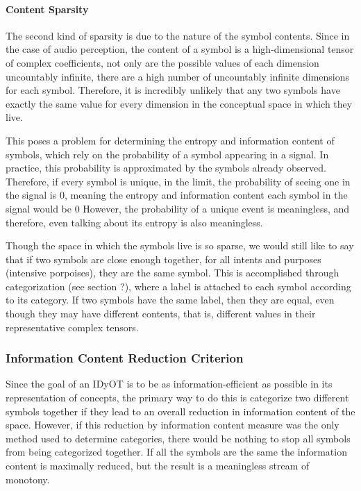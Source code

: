 \paragraph{Content Sparsity}
The second kind of sparsity is due to the nature of the symbol contents.  Since in the case of audio perception, the content of a symbol is a high-dimensional tensor of complex coefficients, not only are the possible values of each dimension uncountably infinite, there are a high number of uncountably infinite dimensions for each symbol.  Therefore, it is incredibly unlikely that any two symbols have exactly the same value for every dimension in the conceptual space in which they live.  

This poses a problem for determining the entropy and information content of symbols, which rely on the probability of a symbol appearing in a signal.  In practice, this probability is approximated by the symbols already observed.  Therefore, if every symbol is unique, in the limit, the probability of seeing one in the signal is 0, meaning the entropy and information content each symbol in the signal would be 0 However, the probability of a unique event is meaningless, and therefore, even talking about its entropy is also meaningless.  

Though the space in which the symbols live is so sparse, we would still like to say that if two symbols are close enough together, for all intents and purposes (intensive porpoises), they are the same symbol.  This is accomplished through categorization (see section ?), where a label is attached to each symbol according to its category.  If two symbols have the same label, then they are equal, even though they may have different contents, that is, different values in their representative complex tensors.



\subsubsection{Information Content Reduction Criterion} 
Since the goal of an IDyOT is to be as information-efficient as possible in its representation of concepts, the primary way to do this is categorize two different symbols together if they lead to an overall reduction in information content of the space.  However, if this reduction by information content measure was the only method used to determine categories, there would be nothing to stop all symbols from being categorized together.  If all the symbols are the same the information content is maximally reduced, but the result is a meaningless stream of monotony.

